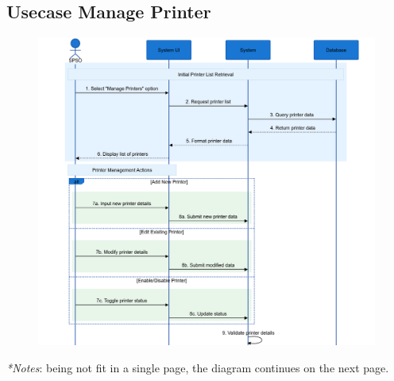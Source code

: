 
\subsection{Usecase Manage Printer}

\begin{figure}[H]
    \centering
    \includegraphics[width=\textwidth ]{images/sequence_diagram/Manage Printers_1.png}
    \label{fig:manage_printer}
\end{figure}

\small \textit{*Notes}: being not fit in a single page, the diagram continues on the next page.

\normalsize

